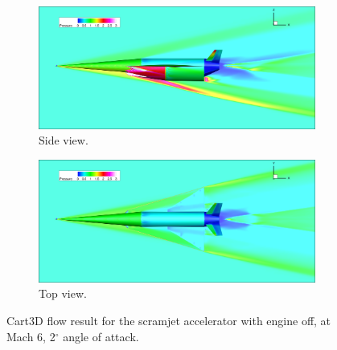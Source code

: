\begin{figure}[ht]
\begin{subfigure}{.9\textwidth}
	\centering
	\includegraphics[width=0.9\linewidth]{figures/3_vehicle_design/CartSide}
	\caption{Side view.}
	\label{fig:CartSide}
\end{subfigure}

\begin{subfigure}{.9\textwidth}
	\centering
	\includegraphics[width=0.9\linewidth]{figures/3_vehicle_design/CartTop}
	\caption{Top view.}
	\label{fig:CartTop}
\end{subfigure}
\caption{Cart3D flow result for the scramjet accelerator with engine off, at Mach 6, 2$^\circ$ angle of attack.}
\label{fig:CartSPART}
\end{figure}

